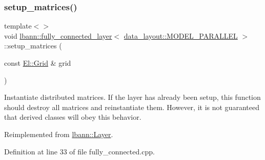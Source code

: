 \mbox{\label{classlbann_1_1fully__connected__layer_a1f0ae7a5f172e5ced011eaa2755fd04e}} 
\subsubsection{\texorpdfstring{setup\+\_\+matrices()}{setup\_matrices()}\hspace{0.1cm}{\footnotesize\ttfamily [1/3]}}
{\footnotesize\ttfamily template$<$$>$ \\
void \hyperlink{classlbann_1_1fully__connected__layer}{lbann\+::fully\+\_\+connected\+\_\+layer}$<$ \hyperlink{base_8hpp_a786677cbfb3f5677b4d84f3056eb08dbac94d7b0e44ab8bdcdad694a673cdeae0}{data\+\_\+layout\+::\+M\+O\+D\+E\+L\+\_\+\+P\+A\+R\+A\+L\+L\+EL} $>$\+::setup\+\_\+matrices (\begin{DoxyParamCaption}\item[{const \hyperlink{base_8hpp_a9951bb1719d534e0401b1f06cad19eab}{El\+::\+Grid} \&}]{grid }\end{DoxyParamCaption})\hspace{0.3cm}{\ttfamily [virtual]}}

Instantiate distributed matrices. If the layer has already been setup, this function should destroy all matrices and reinstantiate them. However, it is not guaranteed that derived classes will obey this behavior. 

Reimplemented from \hyperlink{classlbann_1_1Layer_a57bbe21131dc00ab5cf9ea5e3656808e}{lbann\+::\+Layer}.



Definition at line 33 of file fully\+\_\+connected.\+cpp.


